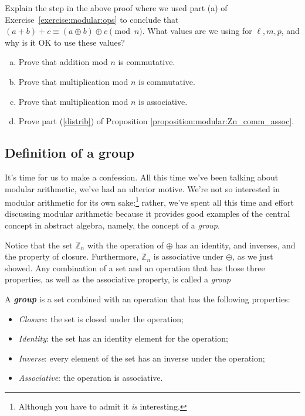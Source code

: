 \begin{exercise}{}
Explain the step in the above proof where we used  part (a) of Exercise~\ref{exercise:modular:ops} to conclude that
$(a + b) + c  \equiv  (a \oplus b) \oplus c \pmod{n}$.  What values are we using for $\ell, m, p$, and why is it OK to use these values?
\end{exercise}

\begin{exercise}{}
\begin{enumerate}[(a)]
\item
Prove that addition mod $n$ is commutative.
\item
Prove that multiplication mod $n$ is commutative.
\item
Prove that multiplication mod $n$ is associative.
\item
Prove  part (\ref{distrib}) of Proposition \ref{proposition:modular:Zn_comm_assoc}.
\end{enumerate}
\end{exercise} 

\subsection{Definition of a group}\label{DefOfGroup}
It's time for us to make a confession. All this time we've been talking about modular arithmetic, we've had an ulterior motive. We're not so interested in modular arithmetic for its own sake:\footnote{Although you have to admit it \emph{is} interesting.} rather, we've spent all this time and effort discussing modular arithmetic because it provides good examples of the central concept in abstract algebra, namely, the concept of a \emph{group}.

Notice that the set ${\mathbb Z}_n$ with the operation of $\oplus$ has an identity, and inverses, and the property of closure. Furthermore, ${\mathbb Z}_n$ is associative under $\oplus$, as we just showed.  Any combination of a set and an operation that has those three properties, as well as the associative property, is called a \emph{group}

\begin{defn}  A \textbf{\textit{group}} is a set combined with an operation that has the following properties:
\begin{itemize}
\item \emph{Closure}: the set is closed under the operation;
\item \emph{Identity}: the set has an identity element for the operation;
\item \emph{Inverse}: every element of the set has an inverse under the operation;
\item \emph{Associative}: the operation is associative.
\end{itemize}
\end{defn}

